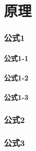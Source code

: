 \documentclass{ctexart}
\begin{document}
\tableofcontents %

\part{原理}
\section{公式1}
\subsection{公式1-1}
\subsection{公式1-2}
\subsection{公式1-3}
\section{公式2}
\section{公式3}
\end{document}
